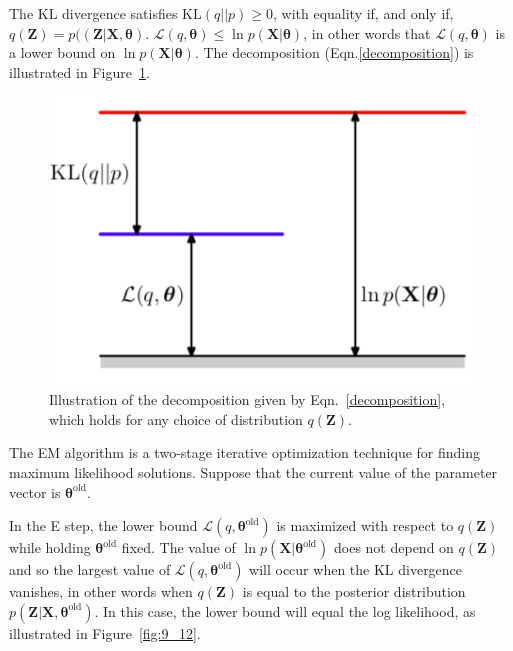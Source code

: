 \documentclass[5p,sort&compress]{elsarticle}
\begin{document}
The KL divergence satisfies $\mathrm{KL}(q||p) \geq 0$, with equality if, and only if, $q(\mathbf{Z}) = p((\mathbf{Z}|\mathbf{X},\boldsymbol{\theta})$. $\mathcal{L}(q, \boldsymbol{\theta}) \leq \ln{p(\mathbf{X}|\boldsymbol{\theta})}$, in other words that $\mathcal{L}(q, \boldsymbol{\theta})$ is a lower bound on $\ln{p(\mathbf{X}|\boldsymbol{\theta})}$. The decomposition (Eqn.\ref{decomposition}) is illustrated in Figure~\ref{fig:9_11}.

\begin{figure}[ht]
     \centering
     \includegraphics[width = 0.8\linewidth]{figure/figure9_11.png}
     \caption{Illustration of the decomposition given by Eqn.~\ref{decomposition}, which holds for any choice of distribution $q(\mathbf{Z}).$}
     \label{fig:9_11}
\end{figure}

The EM algorithm is a two-stage iterative optimization technique for finding maximum likelihood solutions. Suppose that the current value of the parameter vector is $\boldsymbol{\theta}^{\mathrm{old}}$.

In the E step, the lower bound $\mathcal{L}(q, \boldsymbol{\theta}^{\mathrm{old}})$ is maximized with respect to $q(\mathbf{Z})$ while holding $\boldsymbol{\theta}^{\mathrm{old}}$ fixed. The value of $\ln{p(\mathbf{X}|\boldsymbol{\theta}^{\mathrm{old}})}$ does not depend on $q(\mathbf{Z})$ and so the largest value of $\mathcal{L}(q, \boldsymbol{\theta}^{\mathrm{old}})$ will occur when the KL divergence vanishes, in other words when $q(\mathbf{Z})$ is equal to the posterior distribution $p(\mathbf{Z}|\mathbf{X}, \boldsymbol{\theta}^{\mathrm{old}})$. In this case, the lower bound will equal the log likelihood, as illustrated in Figure~\ref{fig:9_12}.
\end{document}
